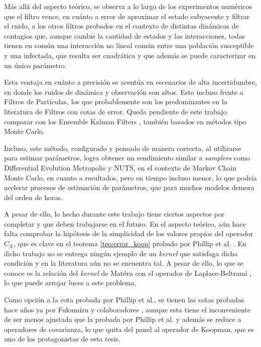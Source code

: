Más allá del aspecto teórico, se observa a lo largo de los experimentos numéricos que el filtro vence, en cuánto a error de aproximar el estado subyacente y filtrar el ruido, a los otros filtros probados en el contexto de distintas dinámicas de contagios que, aunque cambie la cantidad de estados y las interacciones, todas tienen en común una interacción no lineal común entre una población susceptible y una infectada, que resulta ser cuadrática y que además se puede caracterizar en un único parámetro.

Esta ventaja en cuánto a precisión se acentúa en escenarios de alta incertidumbre, en donde los ruidos de dinámica y observación son altos. Esto incluso frente a Filtros de Partículas, los que probablemente son los predominantes en la literatura de Filtros con cotas de error. Queda pendiente de este trabajo comparar con los Ensemble Kalman Filters \cite{Evensen1994SequentialStatistics}, también basados en métodos tipo Monte Carlo.

Incluso, este método, configurado y pensado de manera correcta, al utilizarse para estimar parámetros, logra obtener un rendimiento similar a \textit{samplers} como Differential Evolution Metropolis y NUTS, en el contexto de Markov Chain Monte Carlo, en cuanto a resultados, pero en tiempo incluso menor, lo que podría acelerar procesos de estimación de parámetros, que para muchos modelos demora del orden de horas.

A pesar de ello, lo hecho durante este trabajo tiene ciertos aspectos por completar y que deben trabajarse en el futuro. En el aspecto teórico, aún hace falta comprobar la hipótesis de la simplicidad de los valores propios del operador $C_X$, que es clave en el teorema \ref{teo:error_koop} probado por Phillip et al. \cite{Philipp2024ErrorOperator}. En dicho trabajo no se entrega ningún ejemplo de un \textit{kernel} que satisfaga dicha condición y en la literatura aún no se encuentra tal. A pesar de ello, lo que se conoce es la relación del \textit{kernel} de Matérn con el operador de Laplace-Beltrami \cite{Whittle1963StochasticDimensions, Borovitskiy2020MaternManifolds}, lo que puede arrojar luces a este problema. 

Como opción a la cota probada por Phillip et al., se tienen las cotas probadas hace años ya por Fukumizu y colaboradores \cite{Fukumizu2013KernelKernels}, aunque esta tiene el inconveniente de ser menos ajustada que la probada por Phillip et al. y además se reduce a operadores de covarianza, lo que quita del panel al operador de Koopman, que es uno de los protagonistas de esta tesis. 

